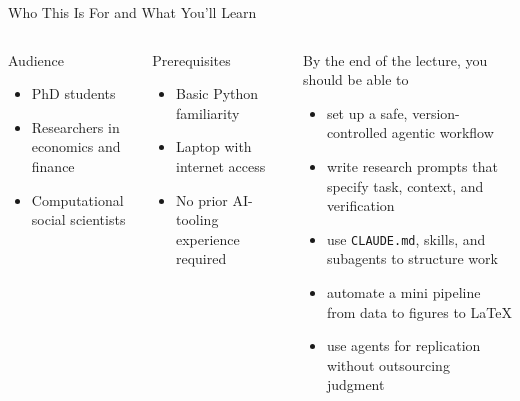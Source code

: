 \documentclass[aspectratio=169,10pt]{beamer}
\begin{document}
\begin{frame}{Who This Is For and What You'll Learn}
\small
\begin{columns}[T]
\begin{block}{Audience}
\begin{itemize}\itemsep2pt
    \item PhD students
    \item Researchers in economics and finance
    \item Computational social scientists
\end{itemize}
\end{block}

\begin{block}{Prerequisites}
\begin{itemize}\itemsep2pt
    \item Basic Python familiarity
    \item Laptop with internet access
    \item No prior AI-tooling experience required
\end{itemize}
\end{block}

\begin{block}{By the end of the lecture, you should be able to}
\begin{itemize}\itemsep2pt
    \item set up a safe, version-controlled agentic workflow
    \item write research prompts that specify task, context, and verification
    \item use \texttt{CLAUDE.md}, skills, and subagents to structure work
    \item automate a mini pipeline from data to figures to LaTeX
    \item use agents for replication without outsourcing judgment
\end{itemize}
\end{block}
\end{columns}
\end{frame}
\end{document}
